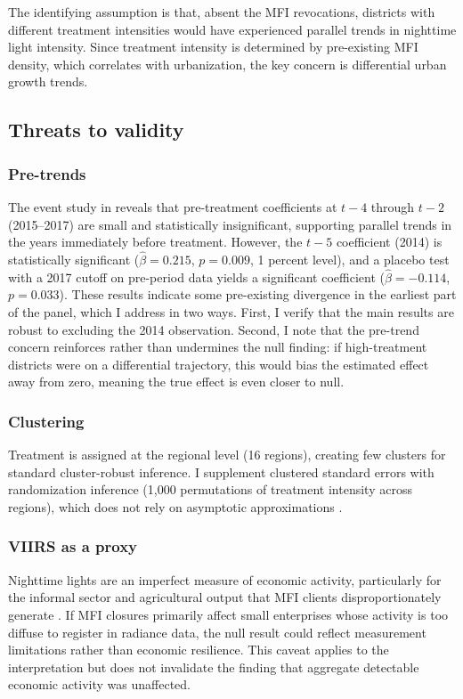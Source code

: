 \documentclass[12pt]{article}
\begin{document}
The identifying assumption is that, absent the MFI revocations, districts with different treatment intensities would have experienced parallel trends in nighttime light intensity. Since treatment intensity is determined by pre-existing MFI density, which correlates with urbanization, the key concern is differential urban growth trends.

\subsection{Threats to validity}

\subsubsection*{Pre-trends} The event study in  reveals that pre-treatment coefficients at $t-4$ through $t-2$ (2015--2017) are small and statistically insignificant, supporting parallel trends in the years immediately before treatment. However, the $t-5$ coefficient (2014) is statistically significant ($\hat{\beta} = 0.215$, $p = 0.009$, 1 percent level), and a placebo test with a 2017 cutoff on pre-period data yields a significant coefficient ($\hat{\beta} = -0.114$, $p = 0.033$). These results indicate some pre-existing divergence in the earliest part of the panel, which I address in two ways. First, I verify that the main results are robust to excluding the 2014 observation. Second, I note that the pre-trend concern reinforces rather than undermines the null finding: if high-treatment districts were on a differential trajectory, this would bias the estimated effect away from zero, meaning the true effect is even closer to null.

\subsubsection*{Clustering} Treatment is assigned at the regional level (16 regions), creating few clusters for standard cluster-robust inference. I supplement clustered standard errors with randomization inference (1,000 permutations of treatment intensity across regions), which does not rely on asymptotic approximations \citep{Fisher1935, Young2019}.

\subsubsection*{VIIRS as a proxy} Nighttime lights are an imperfect measure of economic activity, particularly for the informal sector and agricultural output that MFI clients disproportionately generate \citep{Henderson2012}. If MFI closures primarily affect small enterprises whose activity is too diffuse to register in radiance data, the null result could reflect measurement limitations rather than economic resilience. This caveat applies to the interpretation but does not invalidate the finding that aggregate detectable economic activity was unaffected.
\end{document}
